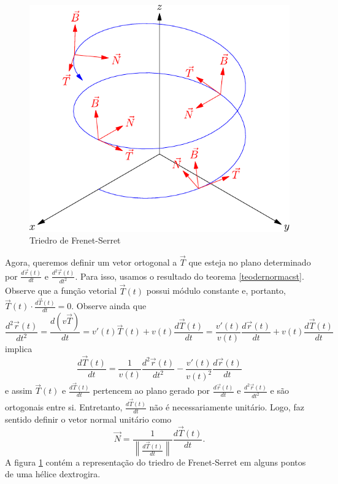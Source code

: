 \begin{figure}%
\begin{center}
    \includegraphics{./cap_curvas/figs/helice_TNB}
\caption{Triedro de Frenet-Serret}\label{Frenet_Serret}
  \end{center}
\end{figure}


Agora, queremos definir um vetor ortogonal a $\vec{T}$ que esteja no plano determinado por $\frac{d\vec{r}(t)}{dt}$ e $\frac{d^2\vec{r}(t)}{dt^2}$. Para isso, usamos o resultado do teorema \ref{teodernormacst}. Observe que a função vetorial $\vec{T}(t)$ possui módulo constante e, portanto, $\vec{T}(t)\cdot \frac{d\vec{T}(t)}{dt}=0$. Observe ainda que
$$
\frac{d^2\vec{r}(t)}{dt^2}=\frac{d (v \vec{T} )}{dt} = v'(t) \vec{T}(t) + v(t) \frac{d \vec{T}(t)}{dt} = \frac{v'(t)}{v(t)} \frac{d\vec{r}(t)}{dt}+ v(t) \frac{d\vec{T}(t)}{dt}
$$
implica
$$ \frac{d\vec{T}(t)}{dt} = \frac{1}{v(t)} \frac{d^2 \vec{r}(t)}{dt^2} - \frac{v'(t)}{v(t)^2} \frac{d \vec{r}(t)}{dt}
$$
e assim
$\vec{T}(t)$ e $\frac{d\vec{T}(t)}{dt}$ pertencem ao plano gerado por $\frac{d\vec{r}(t)}{dt} $ e $\frac{d^2\vec{r}(t)}{dt^2}$ e são ortogonais entre si. Entretanto, $\frac{d\vec{T}(t)}{dt}$ não é necessariamente unitário. Logo, faz sentido definir o vetor normal unitário como
$$
\vec{N}=\frac{1}{\left\|\frac{d\vec{T}(t)}{dt}\right\|} \frac{d \vec{T}(t)}{dt}.
$$
A figura \ref{Frenet_Serret} contém a representação do triedro de Frenet-Serret em alguns pontos de uma hélice dextrogira.

